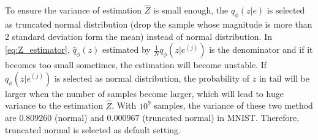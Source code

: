 To ensure the variance of estimation $\hat{Z}$ is small enough, the $q_\phi(z|e)$ is selected as truncated normal distribution (drop the sample whose magnitude is more than 2 standard deviation form the mean) instead of normal distribution. In \cref{eq:Z_estimator}, $\hat{q}_\phi(z)$ estimated by $\frac{1}{N}q_\phi(z|e^{(j)})$ is the denominator and if it becomes too small sometimes, the estimation will become unstable. If $q_\phi(z|e^{(j)})$ is selected as normal distribution, the probability of $z$ in tail will be larger when the number of samples become larger, which will lead to huge variance to the estimation $\hat{Z}$. With $10^9$ samples, the variance of these two method are $0.809260$ (normal) and $0.000967$ (truncated normal) in MNIST. Therefore, truncated normal is selected as default setting. 


